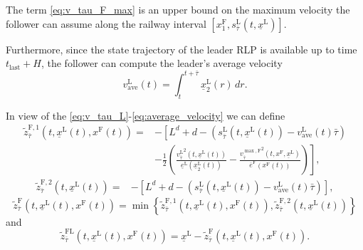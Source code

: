 \documentclass[letterpaper, 10 pt, conference]{ieeeconf}
\theoremstyle{definition}
\theoremstyle{nopoint}
\begin{document}
The term \eqref{eq:v_tau_F_max} is an upper bound on the maximum velocity the follower can assume along the railway interval $\left[x_1^\mathrm{F} ,s_{\bar{\tau}}^\mathrm{L}\left(t,\underline{x}^\mathrm{L}\right)\right]$.

Furthermore, since the state trajectory of the leader RLP is available up to time $t_{\mathrm{last}}+H$, the follower can compute the leader's average velocity
\begin{equation}\label{eq:average_velocity}
v_{\mathrm{ave}}^\mathrm{L}(t)=\int_{t}^{t+\bar{\tau}} \underline{x}_2^\mathrm{L}(r)\, dr.
\end{equation} 


In view of the \eqref{eq:v_tau_L}\--\eqref{eq:average_velocity} we can define 
\begin{equation*}\label{eq:z_tilde_prime}
\begin{aligned}
\tilde{z}^{\mathrm{F},1}_{\bar{\tau}} (t,\underline{x}^\mathrm{L}(t),x^\mathrm{F}(t))=& -\left[L^d +d -\left(s_{\bar{\tau}}^\mathrm{L}(t,\underline{x}^\mathrm{L}(t))-v_{\mathrm{ave}}^\mathrm{L}(t)\bar{\tau}\right)\right. \\
& \left. -\frac{1}{2}\left(\frac{{v_{\bar{\tau}}^\mathrm{L}}^2(t,\underline{x}^\mathrm{L}(t))}{\underline{e}^\mathrm{L}(\underline{x}_2^\mathrm{L}(t))}-\frac{{v_{\bar{\tau}}^{\max, \mathrm{F}}}^2\left( t,x^\mathrm{F},\underline{x}^\mathrm{L} \right)}{\overline{e}^\mathrm{F}(x^\mathrm{F}(t))}\right)\right],
\end{aligned}
\end{equation*}
\begin{equation*}\label{eq:z_tilde_second}
\begin{aligned}
\tilde{z}^{\mathrm{F},2}_{\bar{\tau}} (t,\underline{x}^\mathrm{L}(t))=& -\left[L^d +d -\left(s_{\bar{\tau}}^\mathrm{L}(t,\underline{x}^\mathrm{L}(t))-v_{\mathrm{ave}}^\mathrm{L}(t)\bar{\tau}\right)\right],
\end{aligned}
\end{equation*}
\begin{equation}\label{eq:z_tilde}
	\tilde{z}^{\mathrm{F}}_{\bar{\tau}} (t,\underline{x}^\mathrm{L}(t),x^\mathrm{F}(t)) = \min \left\{ \tilde{z}^{\mathrm{F},1}_{\bar{\tau}} (t,\underline{x}^\mathrm{L}(t),x^\mathrm{F}(t)), \tilde{z}^{\mathrm{F},2}_{\bar{\tau}} (t,\underline{x}^\mathrm{L}(t)) \right\}
\end{equation}
and
\begin{equation}\label{eq:z_tilde_LF_tau}
\tilde{z}^{\mathrm{FL}}_{\bar{\tau}} (t,\underline{x}^\mathrm{L}(t),x^\mathrm{F}(t))=\underline{x}^\mathrm{L}-\tilde{z}^{\mathrm{F}}_{\bar{\tau}} (t,\underline{x}^\mathrm{L}(t),x^\mathrm{F}(t)). 
\end{equation} 
 
\end{document}
